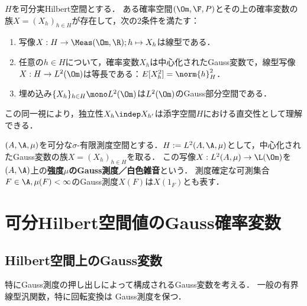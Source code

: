 \documentclass[uplatex,dvipdfmx]{jsreport}
\begin{document}
\begin{proposition}\label{prop-existence-of-noises}
    $H$を可分実Hilbert空間とする．
    ある確率空間$(\Om,\F,P)$とその上の確率変数の族$X=(X_h)_{h\in H}$が存在して，次の2条件を満たす：
    \begin{enumerate}
        \item 写像$X:H\to\Meas(\Om,\R);h\mapsto X_h$は線型である．
        \item 任意の$h\in H$について，確率変数$X_h$は中心化されたGauss変数で，線型写像$X:H\to L^2(\Om)$は等長である：$E[X_h^2]=\norm{h}^2_H$．
        \item 埋め込み$\{X_h\}_{h\in H}\mono L^2(\Om)$は$L^2(\Om)$のGauss部分空間である．
    \end{enumerate}
\end{proposition}
\begin{remark}
    この同一視により，独立性$X_h\indep X_{h'}$は添字空間$H$における直交性として理解できる．
\end{remark}

\begin{definition}
    $(A,\A,\mu)$を可分な$\sigma$-有限測度空間とする．$H:=L^2(A,\A,\mu)$として，中心化されたGauss変数の族$X=(X_h)_{h\in H}$を取る．
    この写像$X:L^2(A,\mu)\to\L(\Om)$を$(A,\A)$上の\textbf{強度$\mu$のGauss測度／白色雑音}という．
    測度確定な可測集合$F\in\A,\mu(F)<\infty$のGauss測度$X(F)$は$X(1_F)$とも表す．
\end{definition}

\section{可分Hilbert空間値のGauss確率変数}

\subsection{Hilbert空間上のGauss変数}

\begin{tcolorbox}[colframe=ForestGreen, colback=ForestGreen!10!white,breakable,colbacktitle=ForestGreen!40!white,coltitle=black,fonttitle=\bfseries\sffamily,
title=]
    特にGauss測度の押し出しによって構成されるGauss変数を考える．
    一般の有界線型汎関数，特に回転変換は
    Gauss測度を保つ．
\end{tcolorbox}
\end{document}
